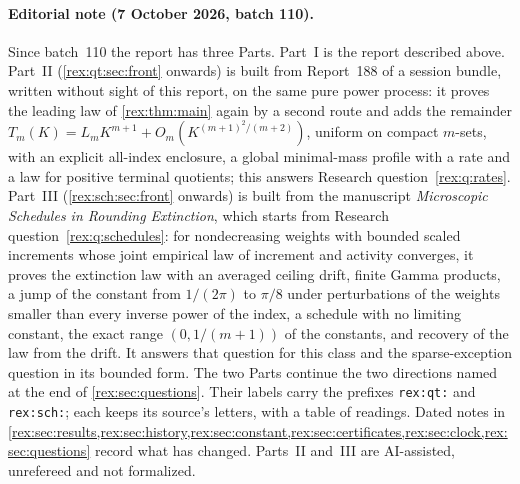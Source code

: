 \documentclass[11pt,a4paper]{article}
\numberwithin{equation}{section}
\theoremstyle{definition}
\theoremstyle{remark}
\begin{document}
\paragraph{Editorial note (7 October 2026, batch 110).}
Since batch~110 the report has three Parts. Part~I is the report described
above. Part~II (\cref{rex:qt:sec:front} onwards) is built from Report~188
of a session bundle, written without sight of this report, on the same pure
power process: it proves the leading law of \cref{rex:thm:main} again by a
second route and adds the remainder
$T_m(K)=L_mK^{m+1}+O_m(K^{(m+1)^2/(m+2)})$, uniform on compact $m$-sets,
with an explicit all-index enclosure, a global minimal-mass profile with a
rate and a law for positive terminal quotients; this answers Research
question~\ref{rex:q:rates}. Part~III (\cref{rex:sch:sec:front} onwards) is
built from the manuscript \emph{Microscopic Schedules in Rounding
Extinction}, which starts from Research question~\ref{rex:q:schedules}: for
nondecreasing weights with bounded scaled increments whose joint empirical
law of increment and activity converges, it proves the extinction law with
an averaged ceiling drift, finite Gamma products, a jump of the constant
from $1/(2\pi)$ to $\pi/8$ under perturbations of the weights smaller
than every inverse power of the index,
a schedule with no limiting constant, the exact range $(0,1/(m+1))$ of the
constants, and recovery of the law from the drift. It answers that question
for this class and the sparse-exception question in its bounded form. The
two Parts continue the two directions named at the end of
\cref{rex:sec:questions}. Their labels carry the prefixes \texttt{rex:qt:}
and \texttt{rex:sch:}; each keeps its source's letters, with a table of
readings. Dated notes in \cref{rex:sec:results,rex:sec:history,rex:sec:constant,rex:sec:certificates,rex:sec:clock,rex:sec:questions}
record what has changed. Parts~II and~III are AI-assisted, unrefereed and
not formalized.
\newpage
\setcounter{tocdepth}{1}
\tableofcontents
\newpage

\end{document}
